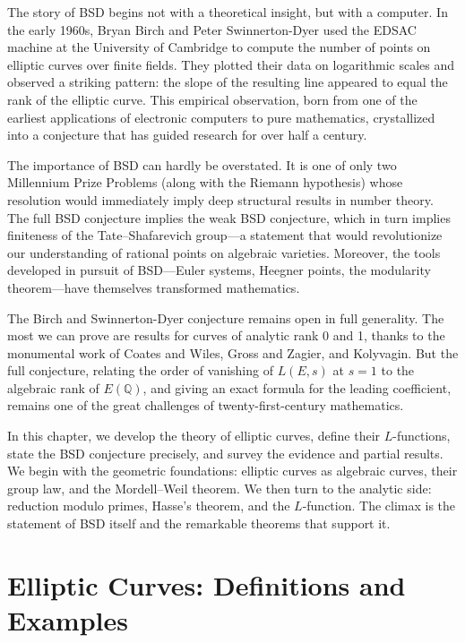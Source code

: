 The story of BSD begins not with a theoretical insight, but with a computer. In the early 1960s, Bryan Birch and Peter Swinnerton-Dyer used the EDSAC machine at the University of Cambridge to compute the number of points on elliptic curves over finite fields. They plotted their data on logarithmic scales and observed a striking pattern: the slope of the resulting line appeared to equal the rank of the elliptic curve. This empirical observation, born from one of the earliest applications of electronic computers to pure mathematics, crystallized into a conjecture that has guided research for over half a century.

The importance of BSD can hardly be overstated. It is one of only two Millennium Prize Problems (along with the Riemann hypothesis) whose resolution would immediately imply deep structural results in number theory. The full BSD conjecture implies the weak BSD conjecture, which in turn implies finiteness of the Tate--Shafarevich group---a statement that would revolutionize our understanding of rational points on algebraic varieties. Moreover, the tools developed in pursuit of BSD---Euler systems, Heegner points, the modularity theorem---have themselves transformed mathematics.

The Birch and Swinnerton-Dyer conjecture remains open in full generality. The most we can prove are results for curves of analytic rank 0 and 1, thanks to the monumental work of Coates and Wiles, Gross and Zagier, and Kolyvagin. But the full conjecture, relating the order of vanishing of $L(E,s)$ at $s=1$ to the algebraic rank of $E(\mathbb{Q})$, and giving an exact formula for the leading coefficient, remains one of the great challenges of twenty-first-century mathematics.

In this chapter, we develop the theory of elliptic curves, define their $L$-functions, state the BSD conjecture precisely, and survey the evidence and partial results. We begin with the geometric foundations: elliptic curves as algebraic curves, their group law, and the Mordell--Weil theorem. We then turn to the analytic side: reduction modulo primes, Hasse's theorem, and the $L$-function. The climax is the statement of BSD itself and the remarkable theorems that support it.

\section{Elliptic Curves: Definitions and Examples}
\label{sec:elliptic-curves}


